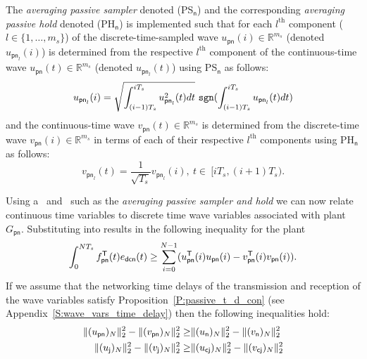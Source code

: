 \begin{definition}
\label{D:avg_ps_ph}
The {\em averaging passive sampler} denoted (\textsf{PS}$_{\mathsf{n}}$) and the corresponding {\em averaging  passive hold} denoted (\textsf{PH}$_{\mathsf{n}}$) is implemented such that for each $l^{\mathrm{th}}$ component ($l \in \{1,\dots,m_s\}$) of the discrete-time-sampled wave $u_{\mathsf{pn}}(i) \in \mathbb{R}^{m_s}$ (denoted $u_{\mathsf{pn}_l}(i)$) is determined from the respective $l^{\mathrm{th}}$ component of the continuous-time wave $u_{\mathsf{pn}}(t) \in \mathbb{R}^{m_s}$ (denoted $u_{\mathsf{pn}_l}(t)$) using \textsf{PS}$_{\mathsf{n}}$ as follows:
\begin{equation}
\label{E:avg_ps}
u_{\mathsf{pn}_l}(i) = \sqrt{\int_{(i-1)T_s}^{iT_s}u_{\mathsf{pn}_l}^2(t) dt}\ \sgn{\int_{(i-1)T_s}^{iT_s}u_{\mathsf{pn}_l}(t) dt}
\end{equation}
and the continuous-time wave $v_{\mathsf{pn}}(t) \in \mathbb{R}^{m_s}$ is determined from the discrete-time wave $v_{\mathsf{pn}}(i) \in \mathbb{R}^{m_s}$ in terms of each of their respective $l^{\mathrm{th}}$ components using \textsf{PH}$_{\mathsf{n}}$ as follows:
\begin{equation}
\label{E:avg_ph}
v_{\mathsf{pn}_l}(t) = \frac{1}{\sqrt{T_s}}v_{\mathsf{pn}_l}(i),\ t \in\ [iT_s,(i+1)T_s).
\end{equation}
\end{definition}
Using a \PS\ and \PH\ such as the {\em averaging passive sampler and
  hold} we can now relate continuous time variables to discrete time
wave variables associated with plant $G_{\mathsf{pn}}$.  Substituting
 into  results in the
following inequality for the plant
\begin{equation}
\label{E:ps_ph_p}
\int_0^{NT_s}  f_{\mathsf{pn}}^{\mathsf{T}} (t) e_{\mathsf{dcn}}(t) \geq \sum_{i=0}^{N-1} (u_{\mathsf{pn}}^{\mathsf{T}}(i)u_{\mathsf{pn}}(i) - v_{\mathsf{pn}}^{\mathsf{T}}(i)v_{\mathsf{pn}}(i)).
\end{equation}
If we assume that the networking time delays of the transmission and
reception of the wave variables satisfy
Proposition~\ref{P:passive_t_d_con} (see
Appendix~\ref{S:wave_vars_time_delay}) then the following inequalities hold:
\begin{align}
\label{E:uv_pn_pj}
\|(u_{\mathsf{pn}})_N\|_{2}^2 - \|(v_{\mathsf{pn}})_N\|_{2}^2 \geq& 
\|(u_{\mathsf{n}})_N\|_{2}^2 - \|(v_{\mathsf{n}})_N\|_{2}^2\\
\label{E:uv_cj_pj}
\|(u_{\mathsf{j}})_N\|_{2}^2 - \|(v_{\mathsf{j}})_N\|_{2}^2 \geq& 
\|(u_{\mathsf{cj}})_N\|_{2}^2 - \|(v_{\mathsf{cj}})_N\|_{2}^2
\end{align}

